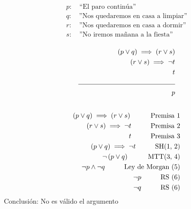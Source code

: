 \documentclass{article}
\begin{document}
  \begin{equation*}
    \begin{split}
      p: \quad\text{“El paro continúa”} \\
      q: \quad\text{”Nos quedaremos en casa a limpiar”} \\
      r: \quad\text{”Nos quedaremos en casa a dormir”} \\
      s: \quad\text{”No iremos mañana a la fiesta”} \\\\
    \end{split}
  \end{equation*}
  \begin{equation*}
    \begin{split}
      \left( p \lor q \right) \implies \left( r \lor s \right) \\
      \left( r \lor s \right) \implies \neg t \\
      t \\
      \noindent\rule{5cm}{0.4pt} \\
      p \\\\
    \end{split}
  \end{equation*}
  \begin{align}
    \left( p \lor q \right) \implies \left( r \lor s \right) \quad\text{ \indent  Premisa 1} \\
    \left( r \lor s \right) \implies \neg t \quad\text{  \indent Premisa 2} \\
    t \quad\text{ \indent Premisa 3} \\
    \left(p \lor q \right) \implies \neg t \quad\text{  \indent SH(1, 2)} \\
    \neg \left( p \lor q \right) \quad\text{ \indent MTT(3, 4)} \\
    \neg p \land \neg q \quad\text{ \indent Ley de Morgan (5)} \\
    \neg p \quad\text{ \indent RS (6)} \\
    \neg q \quad\text{ \indent RS (6)}
  \end{align}
  Conclusión: No es válido el argumento
\end{document}
